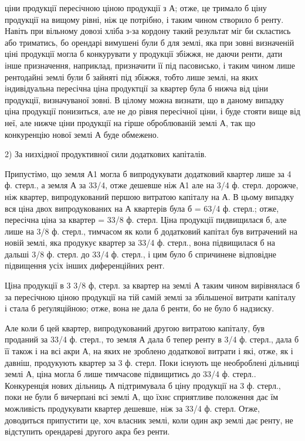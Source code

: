 \parcont{}  %
ціни продукції пересічною ціною продукції з А; отже, це тримало б ціну продукції
на вищому рівні, ніж це потрібно, і таким чином створило б ренту.
Навіть при вільному довозі хліба з-за кордону такий результат міг би скластись
або триматись, бо орендарі вимушені були б для землі, яка при зовні
визначеній ціні продукції могла б конкурувати у продукції збіжжя, не даючи
ренти, дати інше призначення, наприклад, призначити її під пасовисько, і таким
чином лише рентодайні землі були б зайняті під збіжжя, тобто лише землі,
на яких індивідуальна пересічна ціна продуктції за квартер була б нижча від
ціни продукції, визначуваної зовні. В цілому можна визнати, що в даному випадку
ціна продукції понизиться, але не до рівня пересічної ціни, і буде стояти
вище від неї, але нижче ціни продукції на гірше оброблюваній землі А, так
що конкуренцію нової землі А буде обмежено.

2) За низхідної продуктивної сили додаткових капіталів.

Припустімо, що земля А1 могла б випродукувати додатковий квартер
лише за 4 ф. стерл., а земля А за 33/4, отже дешевше ніж А1 але на 3/4
ф. стерл. дорожче, ніж квартер, випродукований першою витратою капіталу на
А. В цьому випадку вся ціна двох випродукованих на А квартерів була б =
63/4 ф. стерл.; отже, пересічна ціна за квартер = 33/8 ф. стерл. Ціна продукції
пидвищилася б, але лише на 3/8 ф. стерл., тимчасом як коли б додатковий
капітал був витрачений на новій землі, яка продукує квартер за 33/4
ф. стерл., вона підвищилася б на дальші 3/8 ф. стерл. до 33/4 ф. стерл., і цим
було б спричинене відповідне підвищення усіх інших диференційних рент.

Ціна продукції в 3 3/8 ф, стерл. за квартер на землі А таким чином
вирівнялася б за пересічною ціною продукції на тій самій землі за збільшеної
витрати капіталу і стала б реґуляційною; отже, вона не дала б ренти, бо не
було б надзиску.

Але коли б цей квартер, випродукований другою витратою капіталу, був проданий
за 33/4 ф. стерл., то земля А дала б тепер ренту в 3/4 ф. стерл.,
дала б її також і на всі акри А, на яких не зроблено додаткової витрати і
які, отже, як і давніш, продукують квартер за 3 ф. стерл. Поки існують ще
необроблені дільниці землі А, ціна могла б лише тимчасове підвищитись до
33/4 ф. стерл.. Конкуренція нових дільниць А підтримувала б ціну продукції
на 3 ф. стерл., поки не були б вичерпані всі землі А, що їхнє сприятливе положення
дає їм можливість продукувати квартер дешевше, ніж за 33/4 ф. стерл.
Отже, доводиться припустити це, хоч власник землі, коли один акр землі дає ренту,
не відступить орендареві другого акра без ренти.

